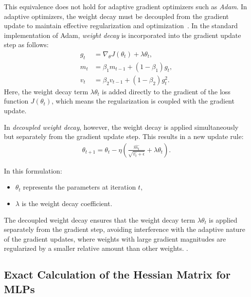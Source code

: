 This equivalence does not hold for adaptive gradient optimizers
such as \emph{Adam}. In adaptive optimizers, the weight decay must be decoupled from the gradient update to
maintain effective regularization and optimization~\cite{Loshchilov2017FixingWD}. In the standard implementation of Adam, \emph{weight decay} is incorporated into the gradient update step as follows:
\begin{align*}
    g_t &= \nabla_{\theta} J(\theta_t) + \lambda \theta_t, \\
    m_t &= \beta_1 m_{t-1} + (1 - \beta_1) g_t, \\
    v_t &= \beta_2 v_{t-1} + (1 - \beta_2) g_t^2.
    \end{align*}
Here, the weight decay term $\lambda \theta_t$ is added directly to the gradient of the loss function $J(\theta_t)$, which means the regularization is coupled with the gradient update.


In \emph{decoupled weight decay}, however, the weight decay is applied simultaneously but separately from the gradient update step. This results in a new update rule:
\begin{align}
\theta_{t+1} = \theta_t - \eta (\frac{ \hat{m_t}}{\sqrt{\hat{v_t} + \epsilon}} + \lambda \theta_t).
\end{align}

In this formulation:
\begin{itemize}
  \item $\theta_t$ represents the parameters at iteration $t$,
  \item $\lambda$ is the weight decay coefficient.
\end{itemize}

The decoupled weight decay ensures that the weight decay term $\lambda \theta_t$ is applied separately from the gradient step,
avoiding interference with the adaptive nature of the gradient updates, where weights with large gradient magnitudes are regularized by a smaller relative
amount than other weights. \cite{Loshchilov2017FixingWD}.


\subsection{Exact Calculation of the Hessian Matrix for MLPs}
\label{sec:hessian_exact}

